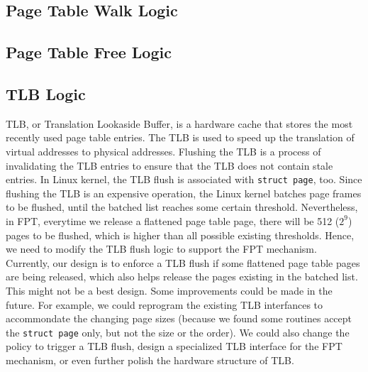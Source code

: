 \subsection{Page Table Walk Logic}

\subsection{Page Table Free Logic}

\subsection{TLB Logic}

TLB, or Translation Lookaside Buffer, is a hardware cache that stores the most recently used page table entries. The TLB is used to speed up the translation of virtual addresses to physical addresses. Flushing the TLB is a process of invalidating the TLB entries to ensure that the TLB does not contain stale entries. In Linux kernel, the TLB flush is associated with \texttt{struct page}, too. Since flushing the TLB is an expensive operation, the Linux kernel batches page frames to be flushed, until the batched list reaches some certain threshold. Nevertheless, in FPT, everytime we release a flattened page table page, there will be 512 ($2^9$) pages to be flushed, which is higher than all possible existing thresholds. Hence, we need to modify the TLB flush logic to support the FPT mechanism. Currently, our design is to enforce a TLB flush if some flattened page table pages are being released, which also helps release the pages existing in the batched list. This might not be a best design. Some improvements could be made in the future. For example, we could reprogram the existing TLB interfances to accommondate the changing page sizes (because we found some routines accept the \texttt{struct page} only, but not the size or the order). We could also change the policy to trigger a TLB flush, design a specialized TLB interface for the FPT mechanism, or even further polish the hardware structure of TLB.
